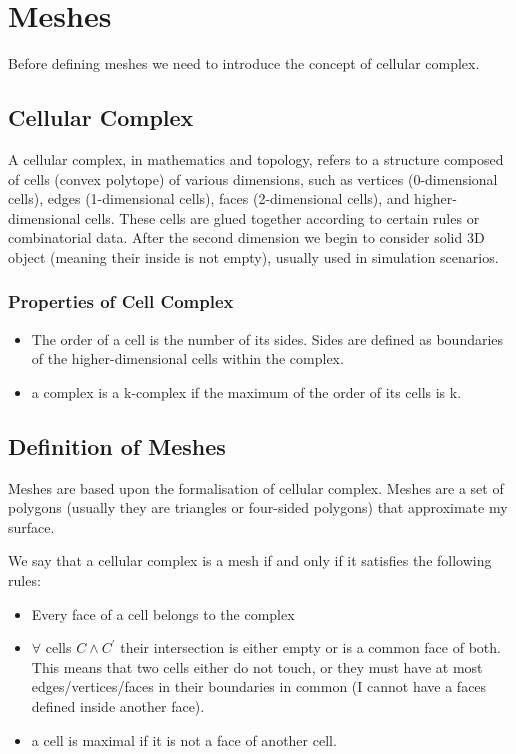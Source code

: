 \section{Meshes}
Before defining meshes we need to introduce the concept of cellular complex.

\subsection{Cellular Complex}
A cellular complex, in mathematics and topology, refers to a structure composed of cells (convex polytope) of various dimensions, such as vertices (0-dimensional cells), edges (1-dimensional cells), faces (2-dimensional cells), and higher-dimensional cells. These cells are glued together according to certain rules or combinatorial data. After the second dimension we begin to consider solid 3D object (meaning their inside is not empty), usually used in simulation scenarios.

\subsubsection{Properties of Cell Complex}
\begin{itemize}
    \item The order of a cell is the number of its sides. Sides are defined as boundaries of the higher-dimensional cells within the complex.
    \item a complex is a k-complex if the maximum of the order of its cells is k.
\end{itemize}


\subsection{Definition of Meshes}
Meshes are based upon the formalisation of cellular complex. Meshes are a set of polygons (usually they are triangles or four-sided polygons) that approximate my surface.\par
We say that a cellular complex is a mesh if and only if it satisfies the following rules:
\begin{itemize}
    \item Every face of a cell belongs to the complex
    \item $\forall$ cells $C \land C^{'}$ their intersection is either empty or is a common face of both. This means that two cells either do not touch, or they must have at most edges/vertices/faces in their boundaries in common (I cannot have a faces defined inside another face). 
    \item a cell is maximal if it is not a face of another cell.
\end{itemize}

